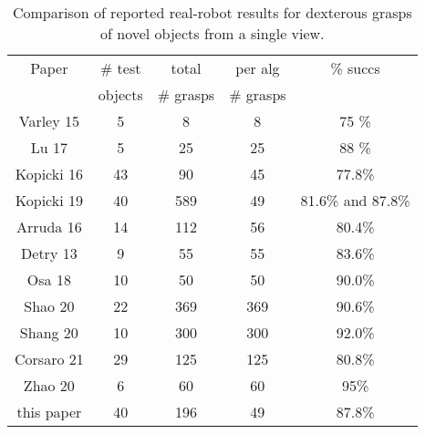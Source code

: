 \begin{table}[t]
\small
\begin{center}
\caption{Comparison of reported real-robot results for dexterous grasps of novel objects from a single view. \label{tab:robot-results-comparison}}
\begin{tabular}{|c|c|c|c|c|} \hline
Paper & \# test   & total         & per alg     & \% succs \\ \
           & objects & \# grasps & \# grasps &              \\ \hline
Varley 15 \cite{varley2015generating} & 5  & 8 & 8  & 75 \%\\
Lu  17 \cite{lu2017planning} & 5 & 25  & 25 & 88  \% \\
Kopicki 16 \cite{kopicki2015ijrr} & 43 & 90  & 45 & 77.8\% \\
Kopicki 19 \cite{kopicki2019ijrr} & 40 & 589  & 49 & 81.6\% and 87.8\% \\
Arruda 16 \cite{arruda2016active} & 14 & 112 & 56 & 80.4\% \\
Detry 13 \cite{detry2013a} & 9 & 55 & 55 & 83.6\% \\
Osa 18  \cite{Osa2018} & 10  & 50 & 50 & 90.0\%\\
Shao 20 \cite{Shao2020} & 22 & 369 & 369 & 90.6\% \\
Shang 20 \cite{Shang2020} & 10 & 300 & 300 & 92.0\% \\
Corsaro 21 \cite{Corsaro2021} & 29 & 125 & 125 & 80.8\% \\
Zhao 20 \cite{Zhao2020} & 6 & 60 & 60 & 95\% \\
this paper  & 40 & 196 & 49 & 87.8\% \\
\hline
\end{tabular}
\end{center}
\end{table}
